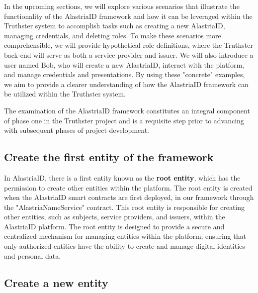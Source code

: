 \documentclass[target=mst,aauheader=]{thud}
\begin{document}
In the upcoming sections, we will explore various scenarios that illustrate the functionality of the AlastriaID framework and how it can be leveraged within the Truthster system to accomplish tasks such as creating a new AlastriaID, managing credentials, and deleting roles. To make these scenarios more comprehensible, we will provide hypothetical role definitions, where the Truthster back-end will serve as both a service provider and issuer. We will also introduce a user named Bob, who will create a new AlastriaID, interact with the platform, and manage credentials and presentations. By using these "concrete" examples, we aim to provide a clearer understanding of how the AlastriaID framework can be utilized within the Truthster system.

The examination of the AlastriaID framework constitutes an integral component of phase one in the Truthster project and is a requisite step prior to advancing with subsequent phases of project development.

\subsection{Create the first entity of the framework}

In AlastriaID, there is a first entity known as the \textbf{root entity}, which has the permission to create other entities within the platform. The root entity is created when the AlastriaID smart contracts are first deployed, in our framework through the "AlastriaNameService" contract. This root entity is responsible for creating other entities, such as subjects, service providers, and issuers, within the AlastriaID platform. The root entity is designed to provide a secure and centralized mechanism for managing entities within the platform, ensuring that only authorized entities have the ability to create and manage digital identities and personal data.

\subsection{Create a new entity}
\end{document}
